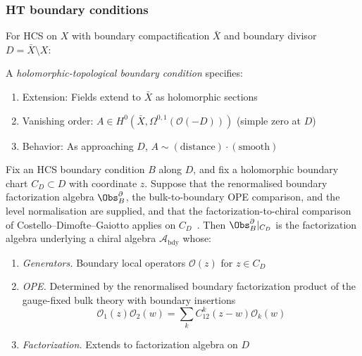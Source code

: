 \subsubsection{HT boundary conditions}

\begin{definition}
For HCS on $X$ with boundary compactification $\bar{X}$ and boundary divisor
$D = \bar{X} \setminus X$:

A \emph{holomorphic-topological boundary condition} specifies:
\begin{enumerate}
\item Extension: Fields extend to $\bar{X}$ as holomorphic sections
\item Vanishing order: $A \in H^0(\bar{X}, \Omega^{0,1}(\mathcal{O}(-D)))$ (simple zero at $D$)
\item Behavior: As approaching $D$, $A \sim (\text{distance}) \cdot (\text{smooth})$
\end{enumerate}
\end{definition}

\begin{theorem}
\label{thm:ht-boundary-chiral-algebra}
Fix an HCS boundary condition \(B\) along \(D\), and fix a holomorphic
boundary chart \(C_D\subset D\) with coordinate \(z\).  Suppose that
the renormalised boundary factorization algebra
\(\Obs^\partial_B\), the bulk-to-boundary OPE comparison, and the
level normalisation are supplied, and that the
factorization-to-chiral comparison of Costello--Dimofte--Gaiotto
applies on \(C_D\)~\cite{CDG20}.  Then \(\Obs^\partial_B|_{C_D}\) is the
factorization algebra underlying a chiral algebra
\(\mathcal{A}_{\text{bdy}}\) whose:
\begin{enumerate}
\item \emph{Generators.} Boundary local operators $\mathcal{O}(z)$ for $z \in C_D$
\item \emph{OPE.} Determined by the renormalised boundary
 factorization product of the gauge-fixed bulk theory with boundary
 insertions
\[\mathcal{O}_1(z) \mathcal{O}_2(w) = \sum_k C_{12}^k(z-w) \mathcal{O}_k(w)\]
\item \emph{Factorization.} Extends to factorization algebra on $D$
\end{enumerate}
\end{theorem}

